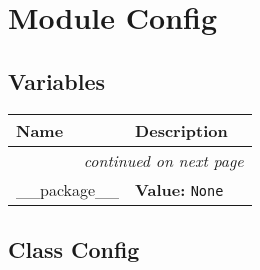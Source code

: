 %
%
%


\section{Module Config}

    \label{Config}


  \subsection{Variables}

    \vspace{-1cm}
\hspace{\varindent}\begin{longtable}{|p{\varnamewidth}|p{\vardescrwidth}|l}
\cline{1-2}
\cline{1-2} \centering \textbf{Name} & \centering \textbf{Description}& \\
\cline{1-2}
\endhead\cline{1-2}\multicolumn{3}{r}{\small\textit{continued on next page}}\\\endfoot\cline{1-2}
\endlastfoot\raggedright \_\-\_\-p\-a\-c\-k\-a\-g\-e\-\_\-\_\- & \raggedright \textbf{Value:} 
{\tt None}&\\
\cline{1-2}
\end{longtable}



\subsection{Class Config}

    \label{Config:Config}

